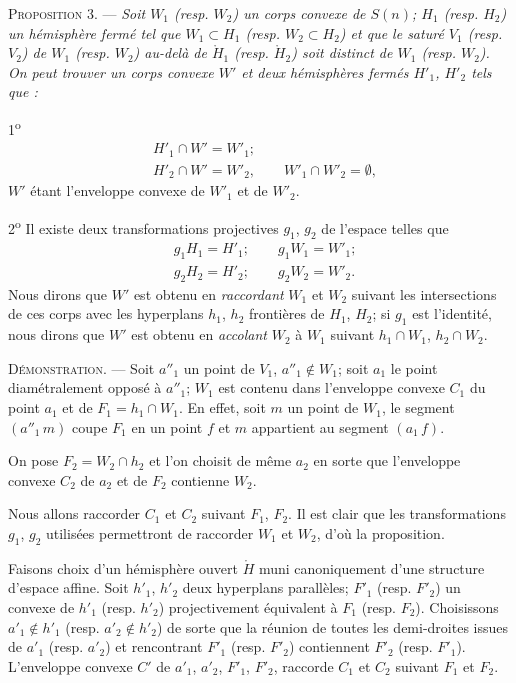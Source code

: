 \documentclass[11pt]{article}
\newenvironment{prop}[1][]{\par\medskip\noindent\textsc{Proposition #1.} --- \itshape}{\par\medskip}
\newenvironment{proof}[1][]{\par}{\par}
\begin{document}
\begin{prop}[3]
Soit $W_1$ (resp. $W_2$) un corps convexe de $S(n)$; $H_1$ (resp. $H_2$) un hémisphère fermé tel
que $W_1\subset H_1$ (resp. $W_2\subset H_2$) et que le saturé $V_1$ (resp. $V_2$) de $W_1$ (resp.
$W_2$) au-delà de $\mathring{H}_1$ (resp. $\mathring{H}_2$) soit
distinct de $W_1$ (resp. $W_2$). On peut trouver un corps convexe $W'$ et deux hémisphères fermés
$H'_1$, $H'_2$ tels que :

1\textsuperscript{o}
\[ \begin{aligned} &H'_1\cap W'=W'_1;\\ &H'_2\cap W'=W'_2,\qquad W'_1\cap W'_2=\emptyset,
\end{aligned} \]
$W'$ étant l'enveloppe convexe de $W'_1$ et de $W'_2$.

2\textsuperscript{o} Il existe deux transformations projectives $g_1$, $g_2$ de l'espace telles
que
\[ \begin{aligned} &g_1H_1=H'_1;\qquad g_1W_1=W'_1;\\ &g_2H_2=H'_2;\qquad g_2W_2=W'_2.
\end{aligned} \]
Nous dirons que $W'$ est obtenu en \textit{raccordant} $W_1$ et $W_2$ suivant les intersections
de ces corps avec les hyperplans $h_1$, $h_2$ frontières de $H_1$, $H_2$; si $g_1$ est
l'identité, nous dirons que $W'$ est obtenu en \textit{accolant} $W_2$ à $W_1$ suivant
$h_1\cap W_1$, $h_2\cap W_2$.
\end{prop}

\begin{proof}
\textsc{Démonstration.} --- Soit $a''_1$ un point de $V_1$, $a''_1\notin W_1$; soit $a_1$ le point
diamétralement opposé à $a''_1$; $W_1$ est contenu dans l'enveloppe convexe $C_1$ du point $a_1$
et de $F_1=h_1\cap W_1$. En effet, soit $m$ un point de $W_1$, le segment $(a''_1\,m)$ coupe $F_1$
en un point $f$ et $m$ appartient au segment $(a_1\,f)$.

On pose $F_2=W_2\cap h_2$ et l'on choisit de même $a_2$ en sorte que l'enveloppe convexe $C_2$ de
$a_2$ et de $F_2$ contienne $W_2$.

Nous allons raccorder $C_1$ et $C_2$ suivant $F_1$, $F_2$. Il est clair que les transformations
$g_1$, $g_2$ utilisées permettront de raccorder $W_1$ et $W_2$, d'où la proposition.

Faisons choix d'un hémisphère ouvert $\mathring{H}$ muni canoniquement d'une structure d'espace
affine. Soit $h'_1$, $h'_2$ deux hyperplans parallèles; $F'_1$ (resp. $F'_2$) un convexe de $h'_1$
(resp. $h'_2$) projectivement équivalent à $F_1$ (resp. $F_2$). Choisissons $a'_1\notin h'_1$
(resp. $a'_2\notin h'_2$) de sorte que la réunion de toutes les demi-droites issues de $a'_1$
(resp. $a'_2$) et rencontrant $F'_1$ (resp. $F'_2$) contiennent $F'_2$ (resp. $F'_1$). L'enveloppe
convexe $C'$ de $a'_1$, $a'_2$, $F'_1$, $F'_2$, raccorde $C_1$ et $C_2$ suivant $F_1$ et $F_2$.
\end{proof}
\end{document}
